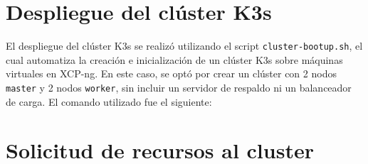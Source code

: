 \section{Despliegue del clúster K3s}\label{sec:despliegue-cluster}
\noindent
El despliegue del clúster K3s se realizó utilizando el script \texttt{cluster-bootup.sh}, el cual automatiza la creación e inicialización de un clúster K3s sobre máquinas virtuales en XCP-ng. En este caso, se optó por crear un clúster con 2 nodos \texttt{master} y 2 nodos \texttt{worker}, sin incluir un servidor de respaldo ni un balanceador de carga. El comando utilizado fue el siguiente:

\section{Solicitud de recursos al cluster}\label{sec:solicitud-recurso}